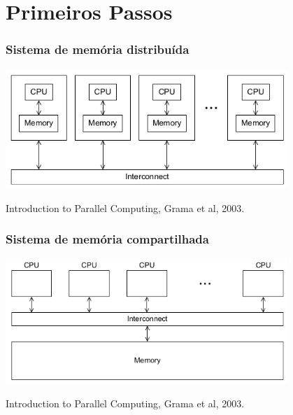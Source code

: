 \documentclass[xcolor={usenames,dvipsnames},12pt,presentation,aspectratio=169]{beamer}
\begin{document}
\section{Primeiros Passos}
\begin{frame}
  \frametitle{Sistema de memória distribuída}
  \vspace{-4mm}
  \begin{center}
	\includegraphics[width=0.8\textwidth]{distribuido.png}
  \end{center}
  \vfill
  {\tiny Introduction to Parallel Computing, Grama et al, 2003.}
\end{frame}
\begin{frame}
  \frametitle{Sistema de memória compartilhada}
  \vspace{-4mm}
  \begin{center}
	\includegraphics[width=0.8\textwidth]{compartilhado.png}
  \end{center}
  \vfill
  {\tiny Introduction to Parallel Computing, Grama et al, 2003.}
\end{frame}
\end{document}
